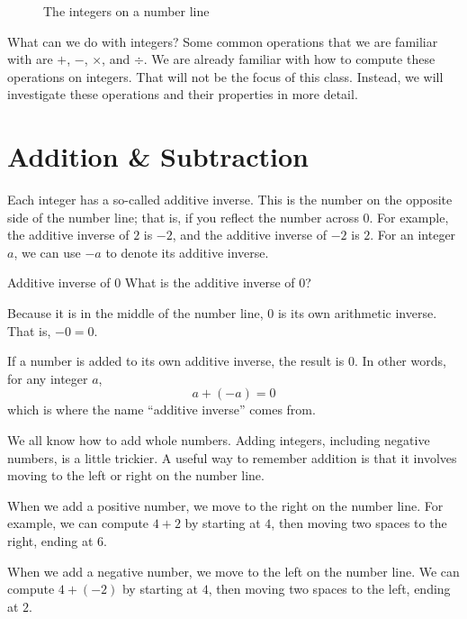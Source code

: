 \documentclass[a4paper,10pt]{report}
\begin{document}
\begin{figure}

 \caption{The integers on a number line}
 \label{nt-int:inumberline}
\end{figure}

What can we do with integers? Some common operations that we are familiar with
are \(+\), \(-\), \(\times\), and \(\div\). We are already familiar with how to
compute these operations on integers. That will not be the focus of this class.
Instead, we will investigate these operations and their properties in more
detail.

\section{Addition \& Subtraction}

Each integer has a so-called \gls{additive inverse}. This is the number on the
opposite side of the number line; that is, if you reflect the number across
\(0\). For example, the additive inverse of \(2\) is \(-2\), and the additive
inverse of \(-2\) is \(2\). For an integer \(a\), we can use \(-a\) to denote
its additive inverse.

\begin{problem}{Additive inverse of \(0\)}
  What is the additive inverse of \(0\)?

  \begin{solution}
    Because it is in the middle of the number line, \(0\) is its own arithmetic
    inverse. That is, \(-0 = 0\).
  \end{solution}
\end{problem}

If a number is added to its own additive inverse, the result is \(0\). In other
words, for any integer \(a\),
\begin{equation}
  a + (-a) = 0
\end{equation}
which is where the name ``additive inverse'' comes from.

We all know how to add whole numbers. Adding integers, including negative
numbers, is a little trickier. A useful way to remember addition is that it
involves moving to the left or right on the number line.

When we add a positive number, we move to the right on the number line. For
example, we can compute \(4+2\) by starting at \(4\), then moving two spaces to
the right, ending at \(6\).

When we add a negative number, we move to the left on the number line. We can
compute \(4 + (-2)\) by starting at \(4\), then moving two spaces to the left,
ending at \(2\).
\end{document}
